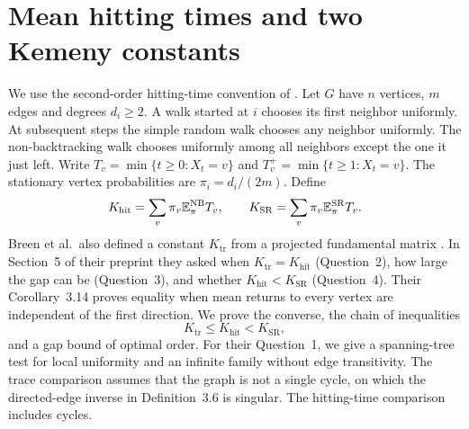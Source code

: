 \documentclass[11pt]{article}
\newcommand{\E}{\mathbb E}
\newcommand{\Kh}{K_{\mathrm{hit}}}
\newcommand{\Kt}{K_{\mathrm{tr}}}
\newcommand{\Ks}{K_{\mathrm{SR}}}
\begin{document}
\section{Mean hitting times and two Kemeny constants}
We use the second-order hitting-time convention of \cite{fasino}. Let $G$ have $n$ vertices, $m$ edges and degrees $d_i\ge2$. A walk started at $i$ chooses its first neighbor uniformly. At subsequent steps the simple random walk chooses any neighbor uniformly. The non-backtracking walk chooses uniformly among all neighbors except the one it just left. Write $T_v=\min\{t\ge0:X_t=v\}$ and $T_v^+=\min\{t\ge1:X_t=v\}$. The stationary vertex probabilities are $\pi_i=d_i/(2m)$. Define
\[
 \Kh=\sum_v\pi_v\E^{\rm NB}_\pi T_v,\qquad
 \Ks=\sum_v\pi_v\E^{\rm SR}_\pi T_v .
\]
Breen et al.\ also defined a constant $\Kt$ from a projected fundamental matrix \cite[Definition~3.6]{breen}. In Section~5 of their preprint they asked when $\Kt=\Kh$ (Question~2), how large the gap can be (Question~3), and whether $\Kh<\Ks$ (Question~4). Their Corollary~3.14 proves equality when mean returns to every vertex are independent of the first direction. We prove the converse, the chain of inequalities
\[
                  \Kt\le\Kh<\Ks,
\]
and a gap bound of optimal order. For their Question~1, we give a spanning-tree test for local uniformity and an infinite family without edge transitivity. The trace comparison assumes that the graph is not a single cycle, on which the directed-edge inverse in Definition~3.6 is singular. The hitting-time comparison includes cycles.
\end{document}
